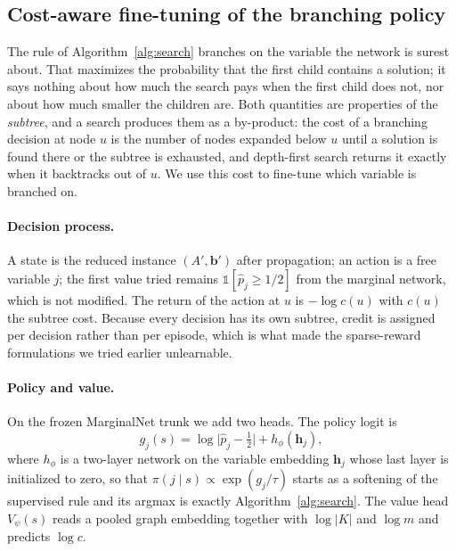 \documentclass[preprint,12pt]{elsarticle}
\begin{document}
\subsection{Cost-aware fine-tuning of the branching policy}
\label{sec:method-rl}

The rule of Algorithm~\ref{alg:search} branches on the variable the network is surest about. That maximizes the probability that the first child contains a solution; it says nothing about how much the search pays when the first child does not, nor about how much smaller the children are. Both quantities are properties of the \emph{subtree}, and a search produces them as a by-product: the cost of a branching decision at node $u$ is the number of nodes expanded below $u$ until a solution is found there or the subtree is exhausted, and depth-first search returns it exactly when it backtracks out of $u$. We use this cost to fine-tune which variable is branched on.

\paragraph{Decision process.} A state is the reduced instance $(A',\mathbf{b}')$ after propagation; an action is a free variable $j$; the first value tried remains $\mathbb{1}[\hat p_j\ge1/2]$ from the marginal network, which is not modified. The return of the action at $u$ is $-\log c(u)$ with $c(u)$ the subtree cost. Because every decision has its own subtree, credit is assigned per decision rather than per episode, which is what made the sparse-reward formulations we tried earlier unlearnable.

\paragraph{Policy and value.} On the frozen MarginalNet trunk we add two heads. The policy logit is
\begin{equation}
g_j(s) = \log\bigl|\hat p_j - \tfrac12\bigr| + h_\phi(\mathbf{h}_j),
\end{equation}
where $h_\phi$ is a two-layer network on the variable embedding $\mathbf{h}_j$ whose last layer is initialized to zero, so that $\pi(j\mid s)\propto\exp(g_j/\tau)$ starts as a softening of the supervised rule and its argmax is exactly Algorithm~\ref{alg:search}. The value head $V_\psi(s)$ reads a pooled graph embedding together with $\log|K|$ and $\log m$ and predicts $\log c$.
\end{document}
